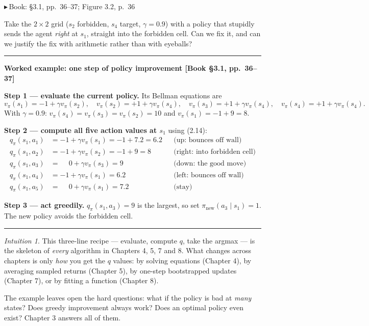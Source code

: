 \documentclass[11pt, letterpaper]{article}
\theoremstyle{runin}
\theoremstyle{runinplain}
\theoremstyle{remark}
\newtheorem*{intuition}{Intuition}
\newcommand{\bk}[1]{{\color{bookblue}\small$\blacktriangleright$\,\textsf{Book: #1}}}
\newcommand{\bkin}[1]{{\color{bookblue}\small[\textsf{Book #1}]}}
\newenvironment{worked}[1]
  {\par\medskip\noindent\rule{\textwidth}{0.4pt}\par\nobreak\vspace{0.3em}
   \noindent\textbf{Worked example: #1}\par\nobreak\vspace{0.2em}\small}
  {\par\nobreak\vspace{0.3em}\noindent\rule{\textwidth}{0.4pt}\par\medskip}
\begin{document}
\bk{\S3.1, pp.~36--37; Figure 3.2, p.~36}

Take the $2\times2$ grid ($s_2$ forbidden, $s_4$ target, $\gamma=0.9$) with a
policy that stupidly sends the agent \emph{right} at $s_1$, straight into the
forbidden cell. Can we fix it, and can we justify the fix with arithmetic rather
than with eyeballs?

\begin{worked}{one step of policy improvement \bkin{\S3.1, pp.~36--37}}
\textbf{Step 1 --- evaluate the current policy.} Its Bellman equations are
\[
  v_\pi(s_1)=-1+\gamma v_\pi(s_2),\quad
  v_\pi(s_2)=+1+\gamma v_\pi(s_4),\quad
  v_\pi(s_3)=+1+\gamma v_\pi(s_4),\quad
  v_\pi(s_4)=+1+\gamma v_\pi(s_4).
\]
With $\gamma=0.9$: $v_\pi(s_4)=v_\pi(s_3)=v_\pi(s_2)=10$ and
$v_\pi(s_1)=-1+9=8$.

\textbf{Step 2 --- compute all five action values at $s_1$} using (2.14):
\[
\begin{aligned}
  q_\pi(s_1,a_1)&=-1+\gamma v_\pi(s_1)=-1+7.2=6.2 &&\text{(up: bounces off wall)}\\
  q_\pi(s_1,a_2)&=-1+\gamma v_\pi(s_2)=-1+9=8     &&\text{(right: into forbidden cell)}\\
  q_\pi(s_1,a_3)&=\phantom{-}0+\gamma v_\pi(s_3)=9 &&\text{(down: the good move)}\\
  q_\pi(s_1,a_4)&=-1+\gamma v_\pi(s_1)=6.2         &&\text{(left: bounces off wall)}\\
  q_\pi(s_1,a_5)&=\phantom{-}0+\gamma v_\pi(s_1)=7.2 &&\text{(stay)}
\end{aligned}
\]

\textbf{Step 3 --- act greedily.} $q_\pi(s_1,a_3)=9$ is the largest, so set
$\pi_{\text{new}}(a_3\mid s_1)=1$. The new policy avoids the forbidden cell.
\end{worked}

\begin{intuition}
This three-line recipe --- evaluate, compute $q$, take the argmax --- is the
skeleton of \emph{every} algorithm in Chapters 4, 5, 7 and 8. What changes across
chapters is only \emph{how} you get the $q$ values: by solving equations
(Chapter 4), by averaging sampled returns (Chapter 5), by one-step bootstrapped
updates (Chapter 7), or by fitting a function (Chapter 8).
\end{intuition}

The example leaves open the hard questions: what if the policy is bad at
\emph{many} states? Does greedy improvement always work? Does an optimal policy
even exist? Chapter 3 answers all of them.
\end{document}
